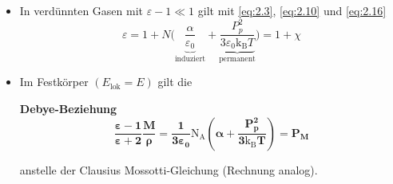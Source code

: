 \begin{itemize}
    	\item In verdünnten Gasen mit $ \varepsilon -1 \ll 1$ gilt mit \eqref{eq:2.3}, \eqref{eq:2.10} und \eqref{eq:2.16}
    		\begin{equation}
    			\label{2.17}
    			\varepsilon = 1 + N\Big( \underbrace{ \frac{\alpha}{ \varepsilon_0}}_{\text{induziert}} + \underbrace{ \frac{P_{p}^2}{3 \varepsilon_0 \mathrm{k}_{\mathrm{B}} T}}_{ \text{permanent}} \Big) = 1 + \chi 
    		\end{equation}
            
    \item Im Festkörper $\left( E _{\text{lok}} = E \right) $ gilt die 
        \begin{important}
            \textbf{Debye-Beziehung}\\
            \begin{equation}
    			\label{2.18}
    			\bm{\frac{ \varepsilon -1}{ \varepsilon +2} \frac{M}{ \rho} = \frac{1}{3 \varepsilon_0} \mathrm{N}_{\mathrm{A}} \left( \alpha + \frac{P_{p}^2 }{3 \mathrm{k}_{\mathrm{B}}T} \right) = P_{M}}
    		\end{equation}
        \end{important}
        anstelle der Clausius Mossotti-Gleichung (Rechnung analog).
    \end{itemize}

